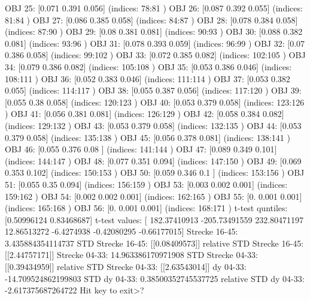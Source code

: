 OBJ 25: [0.071 0.391 0.056] (indices: 78:81 )
OBJ 26: [0.087 0.392 0.055] (indices: 81:84 )
OBJ 27: [0.086 0.385 0.058] (indices: 84:87 )
OBJ 28: [0.078 0.384 0.058] (indices: 87:90 )
OBJ 29: [0.08  0.381 0.081] (indices: 90:93 )
OBJ 30: [0.088 0.382 0.081] (indices: 93:96 )
OBJ 31: [0.078 0.393 0.059] (indices: 96:99 )
OBJ 32: [0.07  0.386 0.058] (indices: 99:102 )
OBJ 33: [0.072 0.385 0.082] (indices: 102:105 )
OBJ 34: [0.079 0.386 0.082] (indices: 105:108 )
OBJ 35: [0.053 0.386 0.046] (indices: 108:111 )
OBJ 36: [0.052 0.383 0.046] (indices: 111:114 )
OBJ 37: [0.053 0.382 0.055] (indices: 114:117 )
OBJ 38: [0.055 0.387 0.056] (indices: 117:120 )
OBJ 39: [0.055 0.38  0.058] (indices: 120:123 )
OBJ 40: [0.053 0.379 0.058] (indices: 123:126 )
OBJ 41: [0.056 0.381 0.081] (indices: 126:129 )
OBJ 42: [0.058 0.384 0.082] (indices: 129:132 )
OBJ 43: [0.053 0.379 0.058] (indices: 132:135 )
OBJ 44: [0.053 0.379 0.058] (indices: 135:138 )
OBJ 45: [0.056 0.378 0.081] (indices: 138:141 )
OBJ 46: [0.055 0.376 0.08 ] (indices: 141:144 )
OBJ 47: [0.089 0.349 0.101] (indices: 144:147 )
OBJ 48: [0.077 0.351 0.094] (indices: 147:150 )
OBJ 49: [0.069 0.353 0.102] (indices: 150:153 )
OBJ 50: [0.059 0.346 0.1  ] (indices: 153:156 )
OBJ 51: [0.055 0.35  0.094] (indices: 156:159 )
OBJ 53: [0.003 0.002 0.001] (indices: 159:162 )
OBJ 54: [0.002 0.002 0.001] (indices: 162:165 )
OBJ 55: [0.    0.001 0.001] (indices: 165:168 )
OBJ 56: [0.    0.001 0.001] (indices: 168:171 )
t-test quntiles: [0.50996124 0.83468687]
t-test values: [ 182.37410913 -205.73491559  232.80471197   12.86513272   -6.4274938
   -0.42080295   -0.66177015]
Strecke 16-45: 3.435884354114737
STD Strecke 16-45: [[0.08409573]]
relative STD Strecke 16-45: [[2.44757171]]%
Strecke 04-33: 14.963386170971908
STD Strecke 04-33: [[0.39434959]]
relative STD Strecke 04-33: [[2.63543014]]%
dy 04-33: -14.709524862199803
STD dy 04-33: 0.38500352745537725
relative STD dy 04-33: -2.617375687264722%
Hit key to exit>? 
